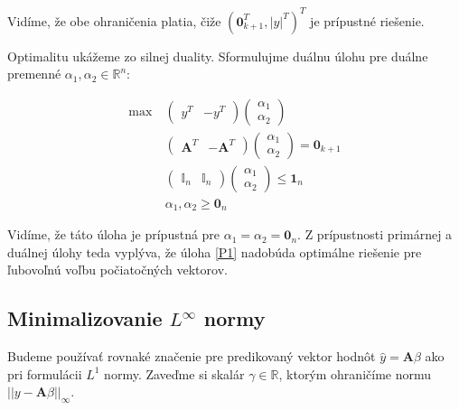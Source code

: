 \documentclass[report.tex]{subfiles}
\begin{document}
\newpage

Vidíme, že obe ohraničenia platia, čiže $\left(\mathbf{0}_{k+1}^T, |y|^T \right)^T$ je prípustné riešenie.

Optimalitu ukážeme zo silnej duality. Sformulujme duálnu úlohu pre duálne premenné $\alpha_1, \alpha_2 \in \mathbb{R}^{n}$:

\begin{align*}
	\text{max}~ &
	\left(
		\begin{array}{c|c}
			y^T & -y^T
		\end{array}
	\right)
	\left(
		\begin{array}{c}
			\alpha_1 \\
			\hline
			\alpha_2
		\end{array}
	\right) \\
	&\left(
		\begin{array}{c|c}
			\mathbf{A}^T & -\mathbf{A}^T
		\end{array}
	\right)
	\left(
		\begin{array}{c}
			\alpha_1 \\
			\hline
			\alpha_2
		\end{array}
	\right)
	=
	\mathbf{0}_{k+1} \\
	&\left(
		\begin{array}{c|c}
			\mathbb{I}_n & \mathbb{I}_n
		\end{array}
	\right)
	\left(
		\begin{array}{c}
			\alpha_1 \\
			\hline
			\alpha_2
		\end{array}
	\right)
	\leq
	\mathbf{1}_{n} \\
	&\alpha_1, \alpha_2 \geq \mathbf{0}_{n} 
\end{align*}

Vidíme, že táto úloha je prípustná pre $\alpha_1 = \alpha_2 = \mathbf{0}_n$. Z prípustnosti primárnej a duálnej úlohy teda vyplýva, že úloha \eqref{P1} nadobúda optimálne riešenie pre ľubovoľnú voľbu počiatočných vektorov.

\subsection{Minimalizovanie $L^{\infty}$ normy}

Budeme používať rovnaké značenie pre predikovaný vektor hodnôt $\hat{y} = \mathbf{A}\beta$ ako pri formulácii $L^1$ normy. Zaveďme si skalár $\gamma \in \mathbb{R}$, ktorým ohraničíme normu $||y - \mathbf{A} \beta||_{\infty}$.
\end{document}
